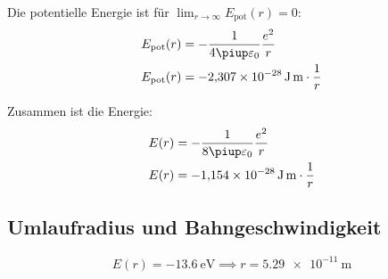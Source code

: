 Die potentielle Energie ist für $\lim_{r \to \infty} E_\text{pot}(r) = 0$:
\begin{align*}
	E_\text{pot}(r) &= - \frac{1}{4 \piup \varepsilon_0} \frac{e^2}{r} \\
	E_\text{pot}(r) &= \SI{-2.307e-28}{\joule\meter} \cdot \frac 1r
\end{align*}

Zusammen ist die Energie:
\begin{align*}
	E(r) &= - \frac{1}{8 \piup \varepsilon_0} \frac{e^2}{r} \\
	E(r) &= \SI{-1.154e-28}{\joule\meter} \cdot \frac 1r
\end{align*}


\subsection{Umlaufradius und Bahngeschwindigkeit}

\[
	E(r) = \SI{-13.6}{\electronvolt}
	\implies
	r = \SI{5.29e-11}{\meter}
\]



\IfFileExists{\bibliographyfile}{
}{}



